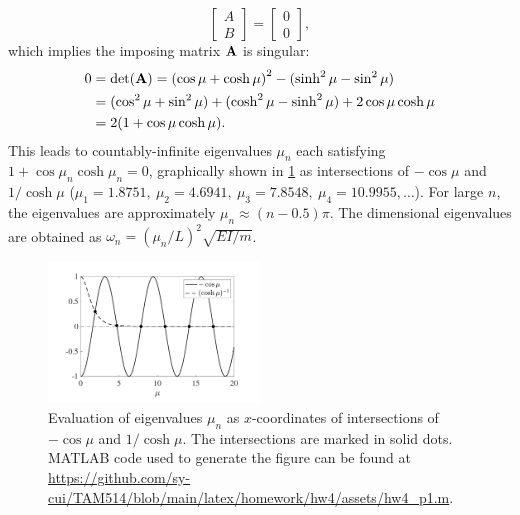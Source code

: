\begin{enumerate}[(i)]
{\begin{equation}
\begin{bmatrix}
            A \\ B
        \end{bmatrix} = \begin{bmatrix}
            0 \\ 0
        \end{bmatrix},
    \end{equation}
    which implies the imposing matrix $\mathbf{A}$ is singular:
    \begin{equation}
    \begin{aligned}
        0 &= \det(\mathbf{A}) = {(\cos\mu + \cosh\mu)}^2 - (\sinh^2\mu - \sin^2\mu) \\
        &= (\cos^2\mu + \sin^2\mu) + (\cosh^2\mu - \sinh^2\mu) + 2\cos\mu \cosh\mu \\
        &= 2(1 + \cos\mu \cosh\mu).
    \end{aligned}
    \end{equation}
    This leads to countably-infinite eigenvalues $\mu_n$ each satisfying $\boxed{1 + \cos\mu_n \cosh\mu_n = 0}$, graphically shown in \cref{fig:hw4_p1_evals} as intersections of $-\cos\mu$ and $1 / \cosh\mu$ ($\mu_1=1.8751,~\mu_2=4.6941,~\mu_3=7.8548,~\mu_4=10.9955,\ldots$). 
    For large $n$, the eigenvalues are approximately $\mu_n \approx (n-0.5)\pi$.
    The dimensional eigenvalues are obtained as $\boxed{\omega_n = {\left(\mu_n / L\right)}^2\sqrt{EI/m}}$.
    \begin{figure}[!ht]
        \centering
        \includegraphics[width=0.5\textwidth]{homework/hw4/assets/hw4_p1_evals.pdf}
        \caption{
            Evaluation of eigenvalues $\mu_n$ as $x$-coordinates of intersections of $-\cos\mu$ and $1 / \cosh\mu$. 
            The intersections are marked in solid dots. 
            MATLAB code used to generate the figure can be found at \url{https://github.com/sy-cui/TAM514/blob/main/latex/homework/hw4/assets/hw4_p1.m}. 
        }\label{fig:hw4_p1_evals}
    \end{figure}
    
}
\end{enumerate}
